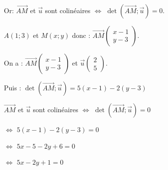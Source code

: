 \documentclass[12pt]{beamer}
\begin{document}
\begin{frame}
Or: $\overrightarrow{AM}$ et $\overrightarrow{u}$  sont colinéaires $\Longleftrightarrow$ $\det(\overrightarrow{AM} ; \overrightarrow{u}) = 0$.

\bigskip

$A(1;3)$ et $M(x;y)$ donc : $\overrightarrow{AM} \begin{pmatrix} x-1 \\ y-3 \end{pmatrix}$.

\medskip

On a : $\overrightarrow{AM} \begin{pmatrix} x-1 \\ y-3 \end{pmatrix}$ et $\overrightarrow{u} \begin{pmatrix} 2 \\ 5\end{pmatrix}$.

\medskip

Puis : $\det(\overrightarrow{AM} ; \overrightarrow{u}) = 5(x-1) - 2(y-3)$

\end{frame}

\begin{frame}
$\overrightarrow{AM}$ et $\overrightarrow{u}$  sont colinéaires $\Longleftrightarrow$ $\det(\overrightarrow{AM} ; \overrightarrow{u}) = 0$ \par 
{}$\Longleftrightarrow$ $5(x-1) - 2(y-3) = 0$ \par 
{}$\Longleftrightarrow$ $5x-5 - 2y+6 = 0$ \par
{}$\Longleftrightarrow$ $5x -2y+1 = 0$ \par 

\bigskip

\end{frame}
\end{document}
